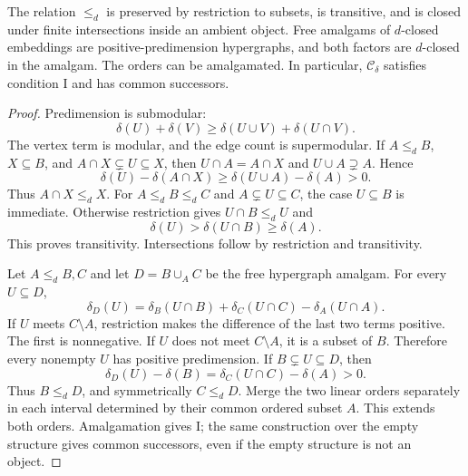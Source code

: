 \begin{lemma}
\label{A:predimension-amalgam}
The relation $\leq_d$ is preserved by restriction to subsets, is
transitive, and is closed under finite intersections inside an ambient
object. Free amalgams of $d$-closed embeddings are positive-predimension
hypergraphs, and both factors are $d$-closed in the amalgam. The orders
can be amalgamated. In particular, $\mathcal C_\delta$ satisfies
condition I and has common successors.
\end{lemma}
\begin{proof}
Predimension is submodular:
\[
 \delta(U)+\delta(V)\geq\delta(U\cup V)+\delta(U\cap V).
 \tag{SM}\label{eq:predimension-submodular}
\]
The vertex term is modular, and the edge count is supermodular.
If $A\leq_d B$, $X\subseteq B$, and
$A\cap X\subsetneq U\subseteq X$, then $U\cap A=A\cap X$ and
$U\cup A\supsetneq A$. Hence
\[
 \delta(U)-\delta(A\cap X)
 \geq\delta(U\cup A)-\delta(A)>0.
\]
Thus $A\cap X\leq_d X$. For $A\leq_d B\leq_d C$ and
$A\subsetneq U\subseteq C$, the case $U\subseteq B$ is immediate.
Otherwise restriction gives $U\cap B\leq_d U$ and
\[
 \delta(U)>\delta(U\cap B)\geq\delta(A).
\]
This proves transitivity. Intersections follow by restriction and
transitivity.

Let $A\leq_d B,C$ and let $D=B\cup_A C$ be the free hypergraph
amalgam. For every $U\subseteq D$,
\[
 \delta_D(U)=\delta_B(U\cap B)+\delta_C(U\cap C)
              -\delta_A(U\cap A).
\]
If $U$ meets $C\setminus A$, restriction makes the difference of
the last two terms positive. The first is nonnegative. If $U$ does
not meet $C\setminus A$, it is a subset of $B$. Therefore every
nonempty $U$ has positive predimension. If $B\subsetneq U\subseteq D$,
then
\[
 \delta_D(U)-\delta(B)=\delta_C(U\cap C)-\delta(A)>0.
\]
Thus $B\leq_d D$, and symmetrically $C\leq_d D$. Merge the two
linear orders separately in each interval determined by their common
ordered subset $A$. This extends both orders. Amalgamation gives I;
the same construction over the empty structure gives common
successors, even if the empty structure is not an object.
\end{proof}

